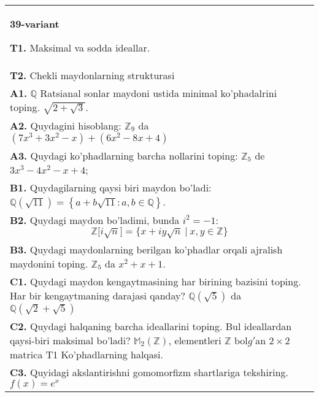 \documentclass{article}
\begin{document}
\begin{tabular}{m{17cm}}
\textbf{39-variant}
\newline

\textbf{T1.} Maksimal va sodda ideallar. \\
\textbf{T2.} Chekli maydonlarning strukturasi \\
\textbf{A1.} \(\mathbb{Q}\) Ratsianal sonlar maydoni ustida minimal ko'phadalrini toping.
\(\sqrt{2 + \sqrt{3}}\). \\
\textbf{A2.} Quydagini hisoblang:
\(\mathbb{Z}_{9}\) da \(\left( 7x^{3} + 3x^{2} - x \right) + \left( 6x^{2} - 8x + 4 \right)\) \\
\textbf{A3.} Quydagi ko'phadlarning barcha nollarini toping:
\(\mathbb{Z}_{5}\) de \(3x^{3} - 4x^{2} - x + 4\); \\
\textbf{B1.} Quydagilarning qaysi biri maydon bo'ladi:
\(\mathbb{Q}\left( \sqrt{11} \right) = \left\{ a + b\sqrt{11}:a,b \in \mathbb{Q} \right\}\). \\
\textbf{B2.} Quydagi maydon bo'ladimi, bunda \(i^{2} = - 1\):
\[\mathbb{Z\lbrack}i\sqrt{n}\rbrack = \{ x + iy\sqrt{n}\ |\ x,y \in \mathbb{Z\}}\] \\
\textbf{B3.} Quydagi maydonlarning berilgan ko'phadlar orqali ajralish maydonini toping.
\(\mathbb{Z}_{5}\) da \(x^{2} + x + 1\). \\
\textbf{C1.} Quydagi maydon kengaytmasining har birining bazisini toping. Har bir kengaytmaning darajasi qanday?
\(\mathbb{Q}\left( \sqrt{5} \right)\) da \(\mathbb{Q}\left( \sqrt{2} + \sqrt{5} \right)\) \\
\textbf{C2.} Quydagi halqaning barcha ideallarini toping. Bul ideallardan qaysi-biri maksimal bo'ladi?
\(\mathbb{M}_{2}\left( \mathbb{Z} \right)\), elementleri \(\mathbb{Z}\) bol\(g'\)an \(2 \times 2\) matrica
T1 Ko'phadlarning halqasi. \\
\textbf{C3.} Quyidagi akslantirishni gomomorfizm shartlariga tekshiring. \(f(x) = e^{x}\) \\

\end{tabular}
\vspace{1cm}
\end{document}
